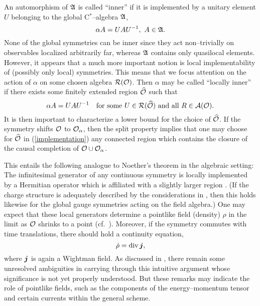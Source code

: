 An automorphism of ${\mathfrak A}$ is called ``inner'' if it is implemented
by a unitary element $U$ belonging to the global C$^*$--algebra 
${\mathfrak A}$, 
\begin{equation}
\alpha A = U A U^{-1}, \ A \in {\mathfrak A}.
\end{equation}
None of the global symmetries can be inner since they act
non--trivially
on observables localized arbitrarily far, whereas ${\mathfrak A}$ contains 
only quasilocal elements. However, it appears that a much more 
important notion is local implementability of (possibly only local)
symmetries. This means that we focus attention on the action 
of $\alpha$ on some chosen algebra ${\cal R}({\cal O})$. Then $\alpha$ may be
called ``locally inner'' if there exists some finitely extended region
$\widehat{\cal O}$ such that 
\begin{equation} 
\alpha A = U A U^{-1} \quad  
\mbox{for some} \ U \in {\cal R} (\widehat{\cal O}) 
\ \mbox{and all} \ R \in {\cal A} ({\cal O}). 
\label{implementation}
\end{equation} 
It is then important to characterize a lower bound for the choice of 
$\widehat{\cal O}$. If the symmetry shifts ${\cal O}$ to ${\cal
  O}_\alpha$,
then the split property implies that one may choose for $\widehat{\cal O}$ in 
(\ref{implementation}) any connected region which contains the closure of
the causal completion of ${\cal O} \cup {\cal O}_\alpha$. 

This entails the following 
analogue to Noether's theorem in the algebraic setting:  
The infinitesimal generator of any continuous symmetry 
is locally implemented by a Hermitian operator which is affiliated with a
slightly larger region \cite{BuDoLo}. 
(If the charge structure is adequately described by the considerations
in \secsix, then this holds likewise for 
the global gauge symmetries acting on the field algebra.) 
One may expect that these local generators 
determine a pointlike field (density) $\rho$ in the
limit as ${\cal O}$ shrinks to a point (cf.\ \secfou).
Moreover, if the symmetry commutes with time translations, there should
hold a continuity equation,  
\begin{equation}
{\dot{\rho}} = \mbox{div} \, \mbox{{\boldmath $j$}},
\end{equation}
where $\mbox{{\boldmath $j$}}$ is again a Wightman field. As discussed in 
\cite{BuDoLo}, there remain some unresolved ambiguities 
in carrying through this intuitive argument whose
significance is not yet properly understood. But 
these remarks may indicate the role of pointlike fields, such as 
the components of the energy--momentum tensor and certain currents
within the general scheme.

